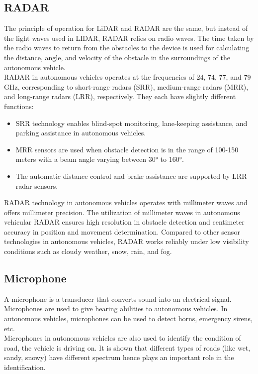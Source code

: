 \subsection{RADAR}
The principle of operation for LiDAR and RADAR are the same, but instead of the light waves used in LIDAR, RADAR relies on radio waves. The time taken by the radio waves to return from the obstacles to the device is used for calculating the distance, angle, and velocity of the obstacle in the surroundings of the autonomous vehicle.
\\
RADAR in autonomous vehicles operates at the frequencies of 24, 74, 77, and 79 GHz, corresponding to short-range radars (SRR), medium-range radars (MRR), and long-range radars (LRR), respectively. They each have slightly different functions:
\begin{itemize}
    \item SRR technology enables blind-spot monitoring, lane-keeping assistance, and parking assistance in autonomous vehicles. 
    \item MRR sensors are used when obstacle detection is in the range of 100-150 meters with a beam angle varying between 30° to 160°. 
    \item The automatic distance control and brake assistance are supported by LRR radar sensors. 
\end{itemize}
RADAR technology in autonomous vehicles operates with millimeter waves and offers millimeter precision. The utilization of millimeter waves in autonomous vehicular RADAR ensures high resolution in obstacle detection and centimeter accuracy in position and movement determination. Compared to other sensor technologies in autonomous vehicles, RADAR works reliably under low visibility conditions such as cloudy weather, snow, rain, and fog. 

\subsection{Microphone}
A microphone is a transducer that converts sound into an electrical signal. Microphones are used to give hearing abilities to autonomous vehicles. In autonomous vehicles, microphones can be used to detect horns, emergency sirens, etc.
\\
Microphones in autonomous vehicles are also used to identify the condition of road, the vehicle is driving on. It is shown that different types of roads (like wet, sandy, snowy) have different spectrum hence plays an important role in the identification.

